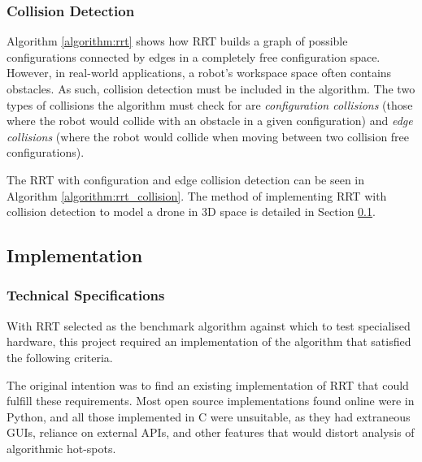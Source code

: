         

    \subsubsection{Collision Detection}

        Algorithm \ref{algorithm:rrt} shows how \gls{RRT} builds a graph of possible \gls{configuration}s connected by edges in a completely free \gls{configuration} space. However, in real-world applications, a robot's \gls{workspace} space often contains obstacles. As such, collision detection must be included in the algorithm. The two types of collisions the algorithm must check for are \textit{configuration collisions} (those where the robot would collide with an obstacle in a given \gls{configuration}) and \textit{edge collisions} (where the robot would collide when moving between two collision free \gls{configuration}s).

        The RRT with \gls{configuration} and edge collision detection can be seen in Algorithm \ref{algorithm:rrt_collision}. The method of implementing \gls{RRT} with collision detection to model a drone in 3D space is detailed in Section \ref{section:implementation}.

        

\newpage
\subsection{Implementation}\label{section:implementation}
    
    \subsubsection{Technical Specifications}

    With \gls{RRT} selected as the benchmark algorithm against which to test specialised hardware, this project required an implementation of the algorithm that satisfied the following criteria.

    

    The original intention was to find an existing implementation of RRT that could fulfill these requirements. Most open source implementations found online were in Python, and all those implemented in C were unsuitable\cite{RoboJackets2019}\cite{Planning2019}\cite{Sourishg2017}\cite{Vss2sn2019}, as they had extraneous \gls{GUI}s, reliance on external \gls{API}s, and other features that would distort analysis of algorithmic hot-spots.

